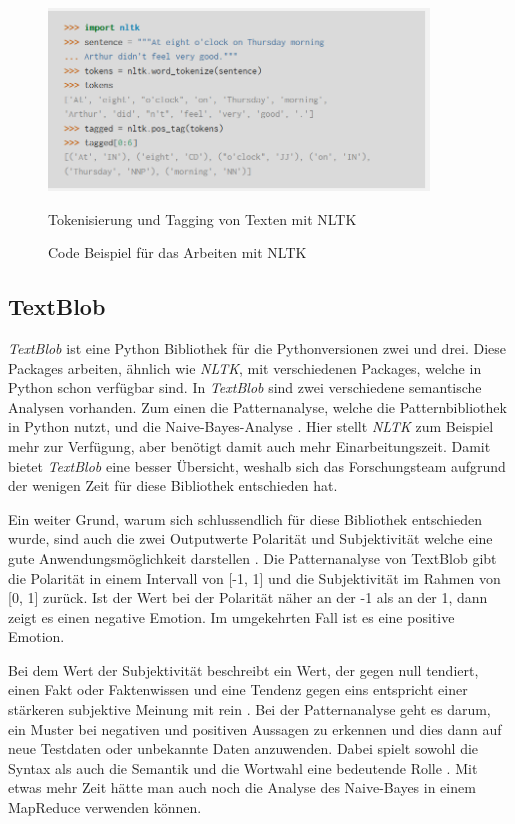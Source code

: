 \begin{figure}[ht]
	\centering
	\includegraphics[width=0.9\textwidth]{images/Kapitel2/Code_Beispiel_2}
		\caption{\label{fig:CodeBeispiel}Code Beispiel für das Arbeiten mit NLTK}{Tokenisierung und Tagging von Texten mit NLTK}
\end{figure}
	
\subsection{TextBlob}
	
\textit{TextBlob} ist eine Python Bibliothek für die Pythonversionen zwei und drei. Diese Packages arbeiten, ähnlich wie \textit{NLTK}, mit verschiedenen Packages, welche in Python schon verfügbar sind. In \textit{TextBlob} sind zwei verschiedene semantische Analysen vorhanden. Zum einen die Patternanalyse, welche die Patternbibliothek in Python nutzt, und die Naive-Bayes-Analyse . Hier stellt \textit{NLTK} zum Beispiel mehr zur Verfügung, aber benötigt damit auch mehr Einarbeitungszeit. Damit bietet \textit{TextBlob} eine besser Übersicht, weshalb sich das Forschungsteam aufgrund der wenigen Zeit für diese Bibliothek entschieden hat.
	
Ein weiter Grund, warum sich schlussendlich für diese Bibliothek entschieden wurde, sind auch die zwei Outputwerte Polarität und Subjektivität welche eine gute Anwendungsmöglichkeit darstellen . Die Patternanalyse von TextBlob gibt die Polarität in einem Intervall von [-1, 1] und die Subjektivität im Rahmen von [0, 1] zurück. Ist der Wert bei der Polarität näher an der -1 als an der 1, dann zeigt es einen negative Emotion. Im umgekehrten Fall ist es eine positive Emotion.
	
Bei dem Wert der Subjektivität beschreibt ein Wert, der gegen null tendiert, einen Fakt oder Faktenwissen und eine Tendenz gegen eins entspricht einer stärkeren subjektive Meinung mit rein  . Bei der Patternanalyse geht es darum, ein Muster bei negativen und positiven Aussagen zu erkennen und dies dann auf neue Testdaten oder unbekannte Daten anzuwenden. Dabei spielt sowohl die Syntax als auch die Semantik und die Wortwahl eine bedeutende Rolle . Mit etwas mehr Zeit hätte man auch noch die Analyse des Naive-Bayes in einem MapReduce verwenden können.

